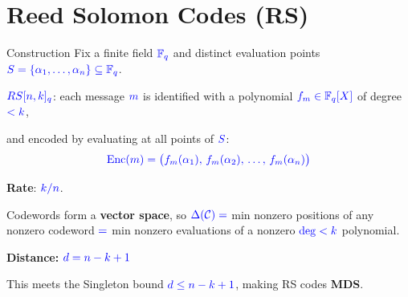\documentclass[10pt,handout]{beamer}
\begin{document}
\section{Reed Solomon Codes (RS)}
\begin{frame}{Construction}
	Fix a finite field $\textcolor{blue}{\textcolor{blue}{\mathbb{F}_q}}$ and distinct evaluation points $\textcolor{blue}{\textcolor{blue}{S=\{\alpha_1,\dots,\alpha_n\}\subseteq \mathbb{F}_q}}$.\pause

	\vspace{0.3em}
	$\textcolor{blue}{\textcolor{blue}{RS[n,k]_q}}$: each message $\textcolor{blue}{\textcolor{blue}{m}}$ is identified with a polynomial $\textcolor{blue}{\textcolor{blue}{f_m\in\mathbb{F}_q[X]}}$ of degree $\textcolor{blue}{\textcolor{blue}{<k}}$, \pause
	
	and encoded by evaluating at all points of $\textcolor{blue}{S}$:
	$$\textcolor{blue}{\textcolor{blue}{\mathrm{Enc}(m) = \bigl(f_m(\alpha_1),\, f_m(\alpha_2),\, \dots,\, f_m(\alpha_n)\bigr)}}$$\pause

	\textbf{Rate}: $\textcolor{blue}{\textcolor{blue}{k/n}}$.\pause

	\vspace{0.4em}
	Codewords form a \textbf{vector space}, so $\textcolor{blue}{\Delta(\mathcal{C}) = }$ min nonzero positions of any nonzero codeword $\textcolor{blue}{= }$ min nonzero evaluations of a nonzero $\textcolor{blue}{\deg < k}$ polynomial.\pause

	\textbf{Distance:} $\textcolor{blue}{\textcolor{blue}{d = n - k + 1}}$

	This meets the Singleton bound $\textcolor{blue}{d \leq n-k+1}$, making RS codes \textbf{MDS}.
\end{frame}
\end{document}
